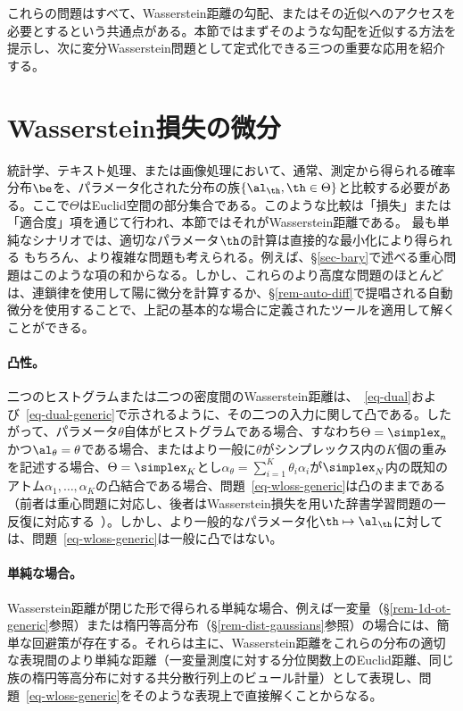 これらの問題はすべて、Wasserstein距離の勾配、またはその近似へのアクセスを必要とするという共通点がある。本節ではまずそのような勾配を近似する方法を提示し、次に変分Wasserstein問題として定式化できる三つの重要な応用を紹介する。

\section{Wasserstein損失の微分}

統計学、テキスト処理、または画像処理において、通常、測定から得られる確率分布$\be$を、パラメータ化された分布の族$\{\al_\th,\th\in\Theta\}$と比較する必要がある。ここで$\Theta$はEuclid空間の部分集合である。このような比較は「損失」または「適合度」項を通じて行われ、本節ではそれがWasserstein距離である。
%
最も単純なシナリオでは、適切なパラメータ$\th$の計算は直接的な最小化により得られる
もちろん、より複雑な問題も考えられる。例えば、\S\ref{sec-bary}で述べる重心問題はこのような項の和からなる。しかし、これらのより高度な問題のほとんどは、連鎖律を使用して陽に微分を計算するか、\S\ref{rem-auto-diff}で提唱される自動微分を使用することで、上記の基本的な場合に定義されたツールを適用して解くことができる。

\paragraph{凸性。} 二つのヒストグラムまたは二つの密度間のWasserstein距離は、~\eqref{eq-dual}および~\eqref{eq-dual-generic}で示されるように、その二つの入力に関して凸である。したがって、パラメータ$\theta$自体がヒストグラムである場合、すなわち$\Theta=\simplex_n$かつ$\al_\theta=\theta$である場合、またはより一般に$\theta$がシンプレックス内の$K$個の重みを記述する場合、$\Theta=\simplex_K$とし$\alpha_\theta=\sum_{i=1}^K \theta_i \alpha_i$が$\simplex_N$内の既知のアトム$\alpha_1,\dots,\alpha_K$の凸結合である場合、問題~\eqref{eq-wloss-generic}は凸のままである（前者は重心問題に対応し、後者はWasserstein損失を用いた辞書学習問題の一反復に対応する~\citep{pmlr-v51-rolet16}）。しかし、より一般的なパラメータ化$\th\mapsto \al_\th$に対しては、問題~\eqref{eq-wloss-generic}は一般に凸ではない。


\paragraph{単純な場合。} Wasserstein距離が閉じた形で得られる単純な場合、例えば一変量（\S\ref{rem-1d-ot-generic}参照）または楕円等高分布（\S\ref{rem-dist-gaussians}参照）の場合には、簡単な回避策が存在する。それらは主に、Wasserstein距離をこれらの分布の適切な表現間のより単純な距離（一変量測度に対する分位関数上のEuclid距離、同じ族の楕円等高分布に対する共分散行列上のビュール計量）として表現し、問題~\eqref{eq-wloss-generic}をそのような表現上で直接解くことからなる。

